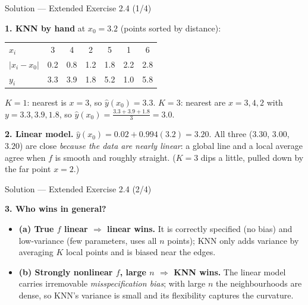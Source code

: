 \documentclass[aspectratio=169,11pt]{beamer}
\begin{document}
\begin{frame}{Solution --- Extended Exercise 2.4 (1/4)}
\begin{solutionbox}
\textbf{1. KNN by hand} at $x_0=3.2$ (points sorted by distance):
\begin{center}\footnotesize
\begin{tabular}{lcccccc}
\toprule
$x_i$        & 3   & 4   & 2   & 5   & 1   & 6   \\
$|x_i-x_0|$  & 0.2 & 0.8 & 1.2 & 1.8 & 2.2 & 2.8 \\
$y_i$        & 3.3 & 3.9 & 1.8 & 5.2 & 1.0 & 5.8 \\
\bottomrule
\end{tabular}
\end{center}
$K=1$: nearest is $x=3$, so $\hat y(x_0)=3.3$. \quad
$K=3$: nearest are $x=3,4,2$ with $y=3.3,3.9,1.8$, so $\hat y(x_0)=\tfrac{3.3+3.9+1.8}{3}=3.0$.

\textbf{2. Linear model.} $\hat y(x_0)=0.02+0.994(3.2)=3.20$. All three ($3.30$, $3.00$, $3.20$) are close \emph{because the data are nearly linear}: a global line and a local average agree when $f$ is smooth and roughly straight. ($K=3$ dips a little, pulled down by the far point $x=2$.)
\end{solutionbox}
\end{frame}

\begin{frame}{Solution --- Extended Exercise 2.4 (2/4)}
\begin{solutionbox}
\textbf{3. Who wins in general?}
\begin{itemize}\setlength\itemsep{1pt}
  \item \textbf{(a) True $f$ linear $\Rightarrow$ linear wins.} It is correctly specified (no bias) and low-variance (few parameters, uses all $n$ points); KNN only adds variance by averaging $K$ local points and is biased near the edges.
  \item \textbf{(b) Strongly nonlinear $f$, large $n$ $\Rightarrow$ KNN wins.} The linear model carries irremovable \emph{misspecification bias}; with large $n$ the neighbourhoods are dense, so KNN's variance is small and its flexibility captures the curvature.
  \end{itemize}
\end{solutionbox}
\end{frame}
\end{document}
